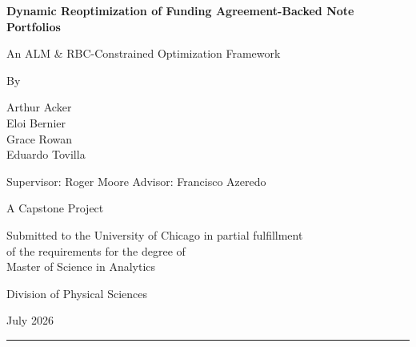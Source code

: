 \documentclass[12pt]{article}
\begin{document}
\thispagestyle{empty}
\setcounter{secnumdepth}{-1}
\captionsetup[figure]{labelsep=period}

\begin{center}
\vspace{1cm}

{\fontsize{18}{22}\selectfont \textbf{Dynamic Reoptimization of Funding Agreement-Backed Note Portfolios}}

\vspace{0.5cm}

{\large An ALM \& RBC-Constrained Optimization Framework}

\vspace{2cm}

{\large By}

\vspace{0.3cm}
Arthur Acker\\
Eloi Bernier\\
Grace Rowan\\
Eduardo Tovilla


\vspace{0.3cm}
Supervisor: Roger Moore
Advisor: Francisco Azeredo

\vspace{1.5cm}

{\normalsize A Capstone Project}

\vspace{0.3cm}

{\normalsize Submitted to the University of Chicago in partial fulfillment\\
of the requirements for the degree of\\
Master of Science in Analytics}

\vspace{0.3cm}

{\normalsize Division of Physical Sciences}

\vspace{0.5cm}

{\normalsize July 2026}

\end{center}

\vfill
\noindent\rule{\textwidth}{1pt}

\newpage
{}
\setcounter{page}{1}
\pagestyle{plain}
\end{document}
